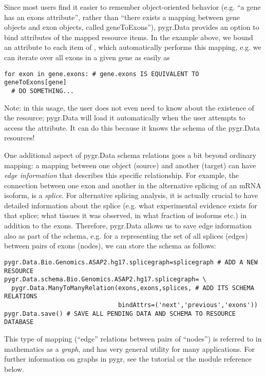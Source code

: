 \documentclass{howto}
\begin{document}
Since most users find it easier to remember object-oriented behavior
(e.g. ``a gene has an exons attribute'', rather than ``there exists a 
mapping between gene objects and exon objects, called geneToExons''),
pygr.Data provides an option to bind attributes of the mapped
resource items.  In the example above, we bound an  attribute
to each item of , which automatically performs this mapping,
e.g. we can iterate over all exons in a given gene as easily as
\begin{verbatim}
for exon in gene.exons: # gene.exons IS EQUIVALENT TO geneToExons[gene]
  # DO SOMETHING...
\end{verbatim}
Note: in this usage, the user does not even need to know about the 
existence of the  resource; pygr.Data will load it
automatically when the user attempts to access the 
attribute.  It can do this because it knows the schema of the pygr.Data
resources!

One additional aspect of pygr.Data schema relations goes a bit beyond
ordinary mapping: a mapping between one object (source) and another
(target) can have {\em edge information} that describes this specific
relationship.  For example, the connection
between one exon and another in the alternative splicing of an mRNA
isoform, is a {\em splice}.  For alternative splicing analysis, it is
actually crucial to have detailed information about the splice (e.g.
what experimental evidence exists for that splice; what tissues it was
observed, in what fraction of isoforms etc.) in addition to the exons.
Therefore, pygr.Data allows us to save edge information also as part 
of the schema, e.g. for a  representing the set of
all splices (edges) between pairs of exons (nodes), we can
store the schema as follows:
\begin{verbatim}
pygr.Data.Bio.Genomics.ASAP2.hg17.splicegraph=splicegraph # ADD A NEW RESOURCE
pygr.Data.schema.Bio.Genomics.ASAP2.hg17.splicegraph= \
  pygr.Data.ManyToManyRelation(exons,exons,splices, # ADD ITS SCHEMA RELATIONS
                               bindAttrs=('next','previous','exons'))
pygr.Data.save() # SAVE ALL PENDING DATA AND SCHEMA TO RESOURCE DATABASE
\end{verbatim}
This type of mapping (``edge'' relations between pairs of ``nodes'')
is referred to in mathematics as a {\em graph}, and has very general
utility for many applications.  For further information on graphs in 
pygr, see the tutorial or the \module{mapping} module reference below.
\end{document}
